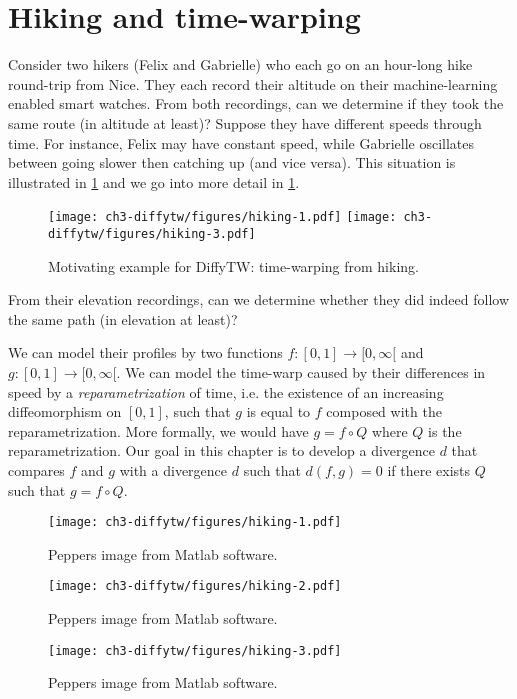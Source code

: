 \section{Hiking and time-warping}\label{sec:appendix-hiking}
Consider two hikers (Felix and Gabrielle) who each go on an hour-long hike round-trip from Nice. They each record their altitude on their machine-learning enabled smart watches. From both recordings, can we determine if they took the same route (in altitude at least)? Suppose they have different speeds through time. For instance, Felix may have constant speed, while Gabrielle oscillates between going slower then catching up (and vice versa). This situation is illustrated in \cref{fig:hiking} and we go into more detail in \cref{sec:appendix-hiking}.

\begin{figure}[!h]
    \centering
    \texttt{[image: ch3-diffytw/figures/hiking-1.pdf]}
    \texttt{[image: ch3-diffytw/figures/hiking-3.pdf]}
    \caption[Hiking example for DiffyTW.]{Motivating example for DiffyTW: time-warping from hiking.}\label{fig:hiking}
\end{figure}

From their elevation recordings, can we determine whether they did indeed follow the same path (in elevation at least)?

We can model their profiles by two functions $f:[0,1] \to [0, \infty[$ and $g:[0, 1] \to [0, \infty[$. We can model the time-warp caused by their differences in speed by a \emph{reparametrization} of time, i.e. the existence of an increasing diffeomorphism on $[0,1]$, such that $g$ is equal to $f$ composed with the reparametrization. More formally, we would have $g = f \circ Q$ where $Q$ is the reparametrization. Our goal in this chapter is to develop a divergence $d$ that compares $f$ and $g$ with a divergence $d$ such that $d(f, g)=0$ if there exists $Q$ such that $g = f \circ Q$.\begin{figure}[!h]
    \centering
    \texttt{[image: ch3-diffytw/figures/hiking-1.pdf]}
    \caption[Sample image for Diffy experiments.]{Peppers image from Matlab software.}
\end{figure}
\begin{figure}[!h]
    \centering
    \texttt{[image: ch3-diffytw/figures/hiking-2.pdf]}
    \caption[Sample image for Diffy experiments.]{Peppers image from Matlab software.}
\end{figure}
\begin{figure}[!h]
    \centering
    \texttt{[image: ch3-diffytw/figures/hiking-3.pdf]}
    \caption[Sample image for Diffy experiments.]{Peppers image from Matlab software.}
\end{figure}

